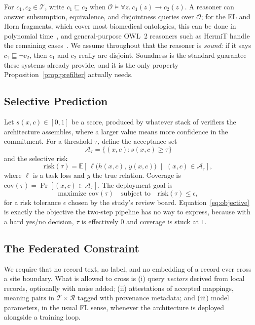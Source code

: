 \documentclass[conference]{IEEEtran}
\newcommand{\onto}{\mathcal{O}}
\newcommand{\att}{\mathcal{A}}
\begin{document}
For $c_1, c_2 \in \mathcal{T}$, write $c_1 \sqsubseteq c_2$ when $\onto \models \forall z.\ c_1(z) \rightarrow c_2(z)$. A reasoner can answer subsumption, equivalence, and disjointness queries over $\onto$; for the EL and Horn fragments, which cover most biomedical ontologies, this can be done in polynomial time~\cite{b31}, and general-purpose OWL~2 reasoners such as HermiT handle the remaining cases~\cite{b30,b32}. We assume throughout that the reasoner is \emph{sound}: if it says $c_1 \sqsubseteq \neg c_2$, then $c_1$ and $c_2$ really are disjoint. Soundness is the standard guarantee these systems already provide, and it is the only property Proposition~\ref{prop:prefilter} actually needs.

\subsection{Selective Prediction}

Let $s(x,c) \in [0,1]$ be a score, produced by whatever stack of verifiers the architecture assembles, where a larger value means more confidence in the commitment. For a threshold $\tau$, define the acceptance set
\begin{equation}
\att_\tau = \{(x,c) : s(x,c) \ge \tau\}
\end{equation}
and the selective risk
\begin{equation}
\mathrm{risk}(\tau) = \mathbb{E}\!\left[\, \ell\big(h(x,c),\, y(x,c)\big) \;\middle|\; (x,c) \in \att_\tau \right],
\end{equation}
where $\ell$ is a task loss and $y$ the true relation. Coverage is $\mathrm{cov}(\tau) = \Pr[(x,c) \in \att_\tau]$. The deployment goal is
\begin{equation}
\text{maximize } \mathrm{cov}(\tau) \quad \text{subject to} \quad \mathrm{risk}(\tau) \le \epsilon ,
\label{eq:objective}
\end{equation}
for a risk tolerance $\epsilon$ chosen by the study's review board. Equation~\eqref{eq:objective} is exactly the objective the two-step pipeline has no way to express, because with a hard yes/no decision, $\tau$ is effectively $0$ and coverage is stuck at $1$.

\subsection{The Federated Constraint}

We require that no record text, no label, and no embedding of a record ever cross a site boundary. What is allowed to cross is (i) query \emph{vectors} derived from local records, optionally with noise added; (ii) attestations of accepted mappings, meaning pairs in $\mathcal{T} \times \mathcal{R}$ tagged with provenance metadata; and (iii) model parameters, in the usual FL sense, whenever the architecture is deployed alongside a training loop.
\end{document}
